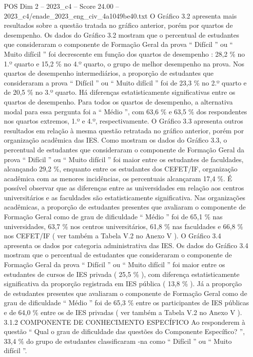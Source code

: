 \begin{textsample}{POS Dim 2 – 2023\_c4 – Score 24.00 – 2023\_c4/enade\_2023\_eng\_civ\_4a1049be40.txt}
O Gráfico 3.2 apresenta mais resultados sobre a questão tratada no gráfico anterior, porém por quartos de desempenho.
Os dados do Gráfico 3.2 mostram que o percentual de estudantes que consideraram o componente de Formação Geral da prova “ Difícil ” ou “ Muito difícil ” foi decrescente em função dos quartos de desempenho : 28,2 \% no 1.º quarto e 15,2 \% no 4.º quarto, o grupo de melhor desempenho na prova.
Nos quartos de desempenho intermediários, a proporção de estudantes que consideraram a prova “ Difícil ” ou “ Muito difícil ” foi de 23,3 \% no 2.º quarto e de 20,5 \% no 3.º quarto.
Há diferenças estatisticamente significativas entre os quartos de desempenho.
Para todos os quartos de desempenho, a alternativa modal para essa pergunta foi a “ Médio ”, com 63,6 \% e 63,5 \% dos respondentes nos quartos extremos, 1.º e 4.º, respectivamente.
O Gráfico 3.3 apresenta outros resultados em relação à mesma questão retratada no gráfico anterior, porém por organização acadêmica das IES.
Como mostram os dados do Gráfico 3.3, o percentual de estudantes que consideraram o componente de Formação Geral da prova “ Difícil ” ou “ Muito difícil ” foi maior entre os estudantes de faculdades, alcançando 29,2 \%, enquanto entre os estudantes dos CEFET/IF, organização acadêmica com as menores incidências, os percentuais alcançaram 17,4 \%.
É possível observar que as diferenças entre as universidades em relação aos centros universitários e as faculdades são estatisticamente significativa.
Nas organizações acadêmicas, a proporção de estudantes presentes que avaliaram o componente de Formação Geral como de grau de dificuldade “ Médio ” foi de 65,1 \% nas universidades, 63,7 \% nos centros universitários, 61,8 \% nas faculdades e 66,8 \% nos CEFET/IF ( ver também a Tabela V.2 no Anexo V ).
O Gráfico 3.4 apresenta os dados por categoria administrativa das IES.
Os dados do Gráfico 3.4 mostram que o percentual de estudantes que consideraram o componente de Formação Geral da prova “ Difícil ” ou “ Muito difícil ” foi maior entre os estudantes de cursos de IES privada ( 25,5 \% ), com diferença estatisticamente significativa da proporção registrada em IES pública ( 13,8 \% ).
Já a proporção de estudantes presentes que avaliaram o componente de Formação Geral como de grau de dificuldade “ Médio ” foi de 65,3 \% entre os participantes de IES públicas e de 64,0 \% entre os de IES privadas ( ver também a Tabela V.2 no Anexo V ). 3.1.2 COMPONENTE DE CONHECIMENTO ESPECÍFICO Ao responderem à questão “ Qual o grau de dificuldade das questões do Componente Específico? ”, 33,4 \% do grupo de estudantes classificaram -na como “ Difícil ” ou “ Muito difícil ”.

\end{textsample}
